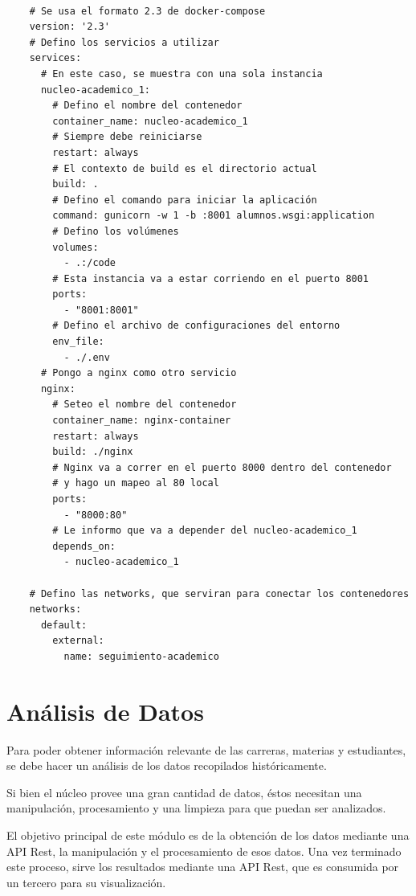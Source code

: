 \begin{verbatim}
    
    # Se usa el formato 2.3 de docker-compose
    version: '2.3'
    # Defino los servicios a utilizar
    services:
      # En este caso, se muestra con una sola instancia
      nucleo-academico_1:
        # Defino el nombre del contenedor
        container_name: nucleo-academico_1
        # Siempre debe reiniciarse
        restart: always
        # El contexto de build es el directorio actual
        build: .
        # Defino el comando para iniciar la aplicación
        command: gunicorn -w 1 -b :8001 alumnos.wsgi:application
        # Defino los volúmenes
        volumes:
          - .:/code
        # Esta instancia va a estar corriendo en el puerto 8001
        ports:
          - "8001:8001"
        # Defino el archivo de configuraciones del entorno
        env_file:
          - ./.env
      # Pongo a nginx como otro servicio
      nginx:
        # Seteo el nombre del contenedor
        container_name: nginx-container
        restart: always
        build: ./nginx
        # Nginx va a correr en el puerto 8000 dentro del contenedor 
        # y hago un mapeo al 80 local
        ports:
          - "8000:80"
        # Le informo que va a depender del nucleo-academico_1
        depends_on:
          - nucleo-academico_1
    
    # Defino las networks, que serviran para conectar los contenedores
    networks:
      default:
        external:
          name: seguimiento-academico
  \end{verbatim}

\section[Análisis de Datos]{Análisis de Datos}

Para poder obtener información relevante de las carreras, materias y estudiantes, se debe hacer un análisis de los datos recopilados históricamente.

Si bien el núcleo provee una gran cantidad de datos, éstos necesitan una manipulación, procesamiento y una limpieza para que puedan ser analizados.

El objetivo principal de este módulo es de la obtención de los datos mediante una API Rest, la manipulación y el procesamiento de esos datos. Una vez terminado este proceso, sirve los resultados mediante una API Rest, que es consumida por un tercero para su visualización.

